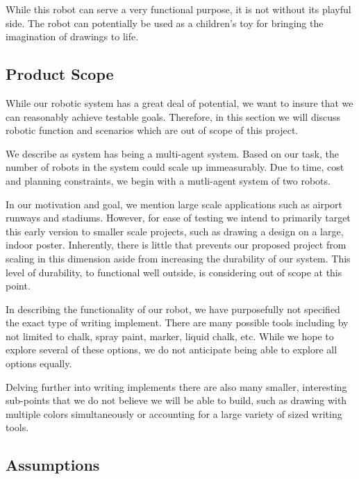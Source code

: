 While this robot can serve a very functional purpose, it is not without its playful side. The robot can potentially be used as a children's toy for bringing the imagination of drawings to life. 

\subsection{Product Scope}
\label{sec:project_scope}
While our robotic system has a great deal of potential, we want to insure that we can reasonably achieve testable goals. Therefore, in this section we will discuss robotic function and scenarios which are out of scope of this project. 

We describe as system has being a multi-agent system. Based on our task, the number of robots in the system could scale up immeasurably. Due to time, cost and planning constraints, we begin with a mutli-agent system of two robots. 

In our motivation and goal, we mention large scale applications such as airport runways and stadiums. However, for ease of testing we intend to primarily target this early version to smaller scale projects, such as drawing a design on a large, indoor poster. Inherently, there is little that prevents our proposed project from scaling in this dimension aside from increasing the durability of our system. This level of durability, to functional well outside, is considering out of scope at this point. 

In describing the functionality of our robot, we have purposefully not specified the exact type of writing implement. There are many possible tools including by not limited to chalk, spray paint, marker, liquid chalk, etc. While we hope to explore several of these options, we do not anticipate being able to explore all options equally. 

Delving further into writing implements there are also many smaller, interesting sub-points that we do not believe we will be able to build, such as drawing with multiple colors simultaneously or accounting for a large variety of sized writing tools. 

\subsection{Assumptions}
\label{sec:assumptions}

